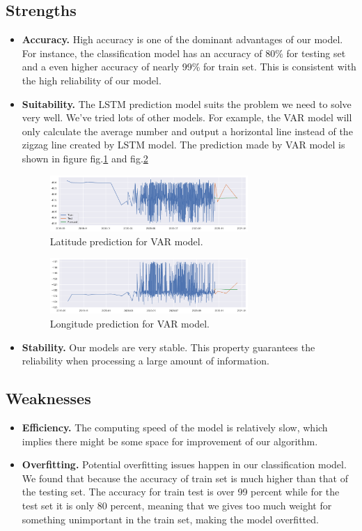 \documentclass{mcmthesis}
\begin{document}
\subsection{Strengths}
\begin{itemize}
	\item \textbf{Accuracy.} High accuracy is one of the dominant advantages of our model.  For instance, the classification model has an accuracy of 80\% for testing set and a even higher accuracy of nearly 99\% for train set. This is consistent with the high reliability of our model.
	\item \textbf{Suitability.} The LSTM prediction model suits the problem we need to solve very well. We've tried lots of other models. For example, the VAR model will only calculate the average number and output a horizontal line instead of the zigzag line created by LSTM model.
	The prediction made by VAR model is shown in figure fig.\ref{fig:la} and fig.\ref{fig:lo}
	
\begin{figure}[!htbp]
	\centering
 	\includegraphics[width = 0.71\textwidth]{LL.png} 
	\caption{Latitude prediction for VAR model.}
	\label{fig:la}
\end{figure}

\begin{figure}[!htbp]
	\centering
 	\includegraphics[width = 0.71\textwidth]{LO.png} 
	\caption{Longitude prediction for VAR model.}
	\label{fig:lo}
\end{figure}
	
	\item \textbf{Stability.} Our models are very stable. This property guarantees the reliability when processing a large amount of information.
\end{itemize}
\subsection{Weaknesses}
\begin{itemize}
	\item \textbf{Efficiency.} The computing speed of the model is relatively slow, which implies there might be some space for improvement of our algorithm. 
	\item \textbf{Overfitting.} Potential overfitting issues happen in our classification model. We found that because the accuracy of train set is much higher than that of the testing set. The accuracy for train test is over 99 percent while for the test set it is only 80 percent, meaning that we gives too much weight for something unimportant in the train set, making the model overfitted.
\end{itemize}
\end{document}
